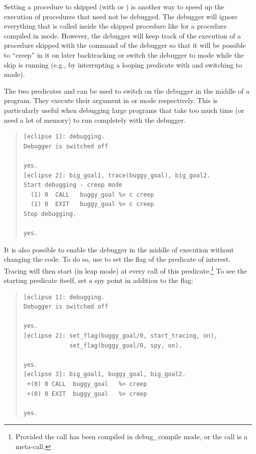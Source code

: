 Setting a procedure to skipped (with
 or
)
is another way
to speed up the execution of procedures that need not be
debugged.  The debugger will ignore everything that is called inside
the skipped procedure like for a procedure compiled in 
mode.  However, the debugger will keep track of the execution of a
procedure skipped with the command  of the debugger so that it
will be possible to ``creep'' in it on later backtracking or switch the
debugger to  mode while the skip is running (e.g.,  by
interrupting a looping predicate with  and switching to
 mode).

The two predicates
 and
 can be used to
switch on the debugger in the middle of a program.  They execute their
argument in  or  mode respectively.  This is
particularly useful when debugging large programs that take too much
time (or need a lot of memory) to run completely with the debugger.
\begin{quote}
\begin{verbatim}
[eclipse 1]: debugging.
Debugger is switched off

yes.
[eclipse 2]: big_goal1, trace(buggy_goal), big_goal2.
Start debugging - creep mode
  (1) 0  CALL   buggy_goal %> c creep
  (1) 0  EXIT   buggy_goal %> c creep
Stop debugging.

yes.
\end{verbatim}
\end{quote}

It is also possible to enable the debugger in the middle of execution
without changing the code.  To do so, use
to set the  flag of the predicate of interest.
Tracing will then start (in leap mode) at every call of this
predicate.\footnote{%
  Provided the call has been compiled in debug_compile mode,
  or the call is a meta-call.}
To see the starting predicate itself,
set a spy point in addition to the  flag:
\begin{quote}
\begin{verbatim}
[eclipse 1]: debugging.
Debugger is switched off

yes.
[eclipse 2]: set_flag(buggy_goal/0, start_tracing, on),
             set_flag(buggy_goal/0, spy, on).

yes.
[eclipse 3]: big_goal1, buggy_goal, big_goal2.
 +(0) 0 CALL  buggy_goal   %> creep
 +(0) 0 EXIT  buggy_goal   %> creep

yes.
\end{verbatim}
\end{quote}

